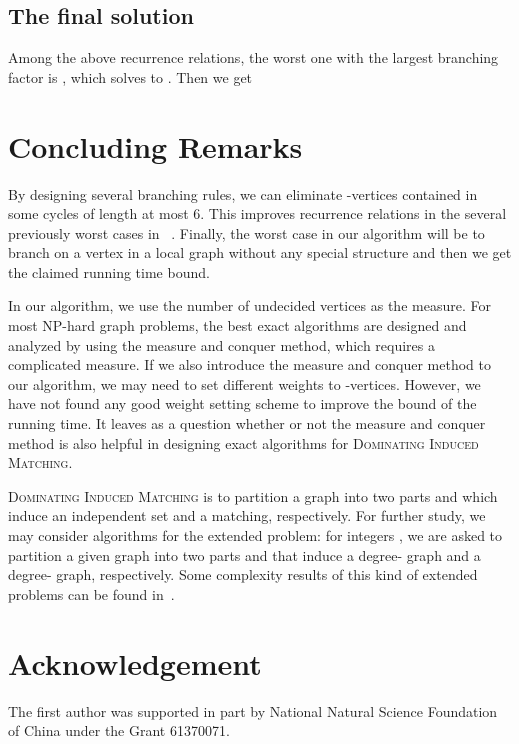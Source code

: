\documentclass{elsart_TR2}
\begin{document}
\subsection{The final solution}

Among the above recurrence relations, the worst one with the largest branching factor is , which solves to . Then we get

\section{Concluding Remarks}\label{sec_con}
By designing several branching rules, we can eliminate -vertices contained in some cycles of length at most 6.
This improves recurrence relations in the several previously worst cases in ~\cite{LMS:DIMexact}.
Finally, the worst case in our algorithm will be to branch on a vertex in a local graph
without any special structure and then we get the claimed running time bound.

In our algorithm, we use the number of undecided vertices as the measure.
For most NP-hard graph problems, the best exact algorithms are designed and analyzed by using the measure and conquer method,
which requires a complicated measure.
If we also introduce the measure and conquer method to our algorithm, we may need to set different weights to -vertices.
However, we have not found any good weight setting scheme to improve the bound of the running time.
It leaves as a question whether or not the measure and conquer method is also helpful in designing exact algorithms for \textsc{Dominating Induced Matching}.



\textsc{Dominating Induced Matching} is to partition a graph into two parts  and  which
 induce an independent set and a matching, respectively.
For further study, we may consider algorithms for the extended problem:  for
integers , we are asked
to partition a given graph into two parts  and    that 
   induce a degree- graph and a degree- graph, respectively.
Some complexity results of this kind of extended problems can be found in~\cite{xn:BDG}.



\section*{Acknowledgement}
The first author was supported in part by National Natural Science Foundation of China under the Grant
61370071.
\end{document}

